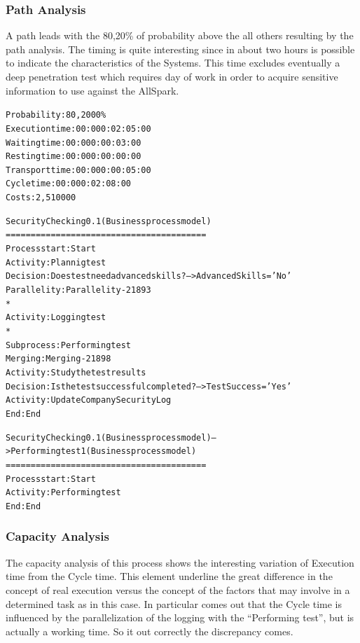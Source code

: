 \subsubsection{Path Analysis}
A path leads with the 80,20\% of probability above the all others resulting by the path analysis. The timing is quite interesting since in about two hours is possible to indicate the characteristics of the Systems. This time excludes eventually a deep penetration test which requires day of work in order to acquire sensitive information to use against the AllSpark.

\begin{alltt}
Probability:   80,2000\%
Execution time:  00:000:02:05:00
Waiting time:  00:000:00:03:00
Resting time:  00:000:00:00:00
Transport time:  00:000:00:05:00
Cycle time:  00:000:02:08:00
Costs:  2,510000

Security Checking 0.1 (Business process model)
========================================
Process start: Start
Activity: Plannig test
Decision: Does test need advanced skills? --> AdvancedSkills='No'
Parallelity: Parallelity-21893
    *
    Activity: Logging test
    *
    Subprocess: Performing test
Merging: Merging-21898
Activity: Study the test results
Decision: Is the test successful completed? --> TestSuccess='Yes'
Activity: Update Company Security Log
End: End

Security Checking 0.1 (Business process model) --> Performing test 1 (Business process model)
========================================
Process start: Start
Activity: Performing test
End: End
\end{alltt}


\subsubsection{Capacity Analysis}
The capacity analysis of this process shows the interesting variation of Execution time from the Cycle time. This element underline the great difference in the concept of real execution versus the concept of the factors that may involve in a determined task as in this case. In particular comes out that the Cycle time is influenced by the parallelization of the logging with the ``Performing test'', but is actually a working time. So it out correctly the discrepancy comes.

